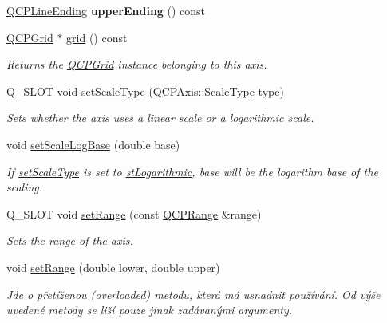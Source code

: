 \begin{DoxyCompactItemize}
\item 
\hypertarget{classQCPAxis_aad503ac95ee34e614ffee0bd66473e1a}{}\hyperlink{classQCPLineEnding}{Q\+C\+P\+Line\+Ending} {\bfseries upper\+Ending} () const \label{classQCPAxis_aad503ac95ee34e614ffee0bd66473e1a}

\item 
\hyperlink{classQCPGrid}{Q\+C\+P\+Grid} $\ast$ \hyperlink{classQCPAxis_ac4fb913cce3072b5e75a4635e0f6cd04}{grid} () const 
\begin{DoxyCompactList}\small\item\em Returns the \hyperlink{classQCPGrid}{Q\+C\+P\+Grid} instance belonging to this axis. \end{DoxyCompactList}\item 
Q\+\_\+\+S\+L\+O\+T void \hyperlink{classQCPAxis_adef29cae617af4f519f6c40d1a866ca6}{set\+Scale\+Type} (\hyperlink{classQCPAxis_a36d8e8658dbaa179bf2aeb973db2d6f0}{Q\+C\+P\+Axis\+::\+Scale\+Type} type)
\begin{DoxyCompactList}\small\item\em Sets whether the axis uses a linear scale or a logarithmic scale. \end{DoxyCompactList}\item 
void \hyperlink{classQCPAxis_a726186054be90487885a748aa1b42188}{set\+Scale\+Log\+Base} (double base)
\begin{DoxyCompactList}\small\item\em If \hyperlink{classQCPAxis_adef29cae617af4f519f6c40d1a866ca6}{set\+Scale\+Type} is set to \hyperlink{classQCPAxis_a36d8e8658dbaa179bf2aeb973db2d6f0abf5b785ad976618816dc6f79b73216d4}{st\+Logarithmic}, {\itshape base} will be the logarithm base of the scaling. \end{DoxyCompactList}\item 
Q\+\_\+\+S\+L\+O\+T void \hyperlink{classQCPAxis_aebdfea5d44c3a0ad2b4700cd4d25b641}{set\+Range} (const \hyperlink{classQCPRange}{Q\+C\+P\+Range} \&range)
\begin{DoxyCompactList}\small\item\em Sets the range of the axis. \end{DoxyCompactList}\item 
void \hyperlink{classQCPAxis_a57d6ee9e9009fe88cb19db476ec70bca}{set\+Range} (double lower, double upper)
\begin{DoxyCompactList}\small\item\em Jde o přetíženou (overloaded) metodu, která má usnadnit používání. Od výše uvedené metody se liší pouze jinak zadávanými argumenty.


\end{DoxyCompactList}
\end{DoxyCompactItemize}
